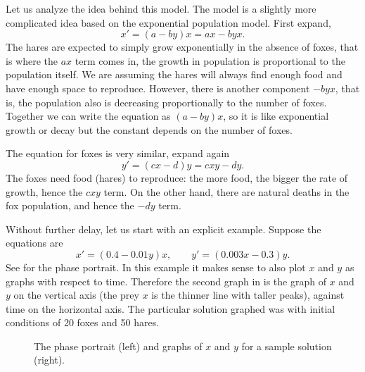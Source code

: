 Let us analyze the idea behind this model.  The model is a slightly more
complicated idea based on the exponential population model.
First expand,
\begin{equation*}
x' = (a-by)x = ax - byx .
\end{equation*}
The hares are expected to simply grow exponentially in the absence of foxes,
that is where the $ax$ term comes in, the growth in population is
proportional to the population itself.  We are assuming the hares
will always find enough food and have enough space to reproduce.  However,
there is another component $-byx$, that is, the population also is
decreasing proportionally to the number of foxes.  Together we can write the
equation as $(a-by)x$, so it is like exponential growth or decay but the
constant depends on the number of foxes.

The equation for foxes is very similar, expand again
\begin{equation*}
y' = (cx-d)y = cxy-dy .
\end{equation*}
The foxes need food (hares) to reproduce: the more food, the bigger the
rate of growth, hence the $cxy$ term.  On the other hand, there are 
natural deaths in the fox population, and hence the $-dy$ term.

Without further delay, let us start with an explicit example.  Suppose the
equations are 
\begin{equation*}
x' = (0.4-0.01y)x, \qquad y' = (0.003x-0.3)y .
\end{equation*}
See  for the phase portrait.  In this example
it makes sense to also plot $x$ and $y$ as graphs with respect to time.
Therefore the second graph in 
 is the graph of $x$ and $y$ on the vertical
axis (the prey $x$ is the thinner line with taller peaks), against time
on the horizontal axis.  The particular solution graphed was with initial
conditions of 20 foxes and 50 hares.
\begin{figure}[h!t]
\capstart
\begin{center}
\caption{The phase portrait (left) and graphs of $x$ and $y$ for
a sample solution (right). \label{fig:nlin-pred-prey}}
\end{center}
\end{figure}

